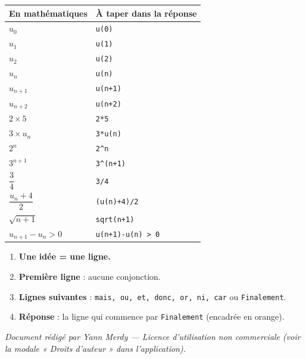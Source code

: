 \documentclass[11pt,a4paper]{article}
\begin{document}
\begin{retenir}
\begin{center}
\renewcommand{\arraystretch}{1.3}
\begin{tabular}{ll}
\toprule
\textbf{En mathématiques} & \textbf{À taper dans la réponse} \\
\midrule
\(u_0\)                  & \verb|u(0)| \\
\(u_1\)                  & \verb|u(1)| \\
\(u_2\)                  & \verb|u(2)| \\
\(u_n\)                  & \verb|u(n)| \\
\(u_{n+1}\)              & \verb|u(n+1)| \\
\(u_{n+2}\)              & \verb|u(n+2)| \\
\(2 \times 5\)           & \verb|2*5| \\
\(3 \times u_n\)         & \verb|3*u(n)| \\
\(2^n\)                  & \verb|2^n| \\
\(3^{n+1}\)              & \verb|3^(n+1)| \\
\(\dfrac{3}{4}\)         & \verb|3/4| \\
\(\dfrac{u_n+4}{2}\)     & \verb|(u(n)+4)/2| \\
\(\sqrt{n+1}\)           & \verb|sqrt(n+1)| \\
\(u_{n+1}-u_n > 0\)      & \verb|u(n+1)-u(n) > 0| \\
\bottomrule
\end{tabular}
\end{center}
\end{retenir}

\begin{retenir}
\begin{enumerate}
  \item \textbf{Une idée = une ligne.}
  \item \textbf{Première ligne} : aucune conjonction.
  \item \textbf{Lignes suivantes} : \texttt{mais, ou, et, donc, or, ni, car}
        ou \texttt{Finalement}.
  \item \textbf{Réponse} : la ligne qui commence par \texttt{Finalement}
        (encadrée en orange).
\end{enumerate}
\end{retenir}

\vfill
\begin{center}
\small\itshape
Document rédigé par Yann Merdy — Licence d'utilisation non commerciale
(voir la modale « Droits d'auteur » dans l'application).
\end{center}
\end{document}
